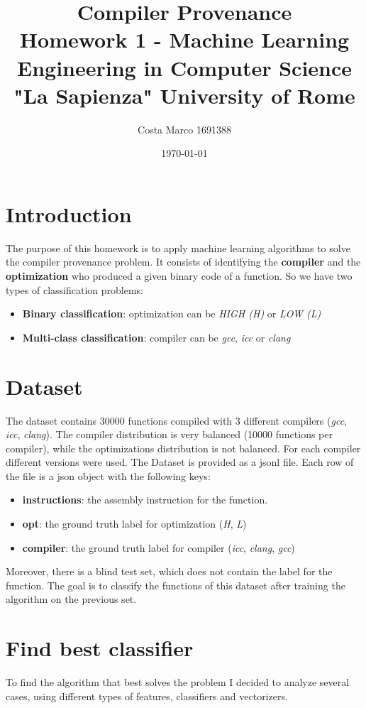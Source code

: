 \documentclass[11pt]{article}
\title{\textbf{Compiler Provenance} \\ \bigskip \large Homework 1 - Machine Learning \\ Engineering in Computer Science \\ "La Sapienza" University of Rome}
\author{Costa Marco 1691388}
\date{\today}
\begin{document}
\maketitle
\pagebreak
\tableofcontents
\pagebreak

\section{Introduction}
The purpose of this homework is to apply machine learning algorithms to solve the compiler provenance problem.
It consists of identifying the \textbf{compiler} and the \textbf{optimization} who produced a given binary code of a function.
So we have two types of classification problems:
\begin{itemize}
	\item \textbf{Binary classification}: optimization can be \textit{HIGH (H)} or \textit{LOW (L)}
	\item \textbf{Multi-class classification}: compiler can be \textit{gcc}, \textit{icc} or \textit{clang}
\end{itemize}

\section{Dataset}
The dataset contains 30000 functions
compiled with 3 different compilers (\textit{gcc}, \textit{icc}, \textit{clang}).
The compiler distribution is very balanced
(10000 functions per compiler), while the optimizations distribution is not balanced. For each compiler different versions were used.
The Dataset is provided as a jsonl file.
Each row of the file is a json object with the
following keys:
\begin{itemize}
\item \textbf{instructions}: the assembly instruction for the
function.
\item \textbf{opt}: the ground truth label for optimization (\textit{H}, \textit{L})
\item \textbf{compiler}: the ground truth label for compiler (\textit{icc},
\textit{clang}, \textit{gcc})
\end{itemize}
Moreover, there is a blind test set, which does not contain the label for the function. The goal is to classify the functions of this dataset after training the algorithm on the previous set.

\section{Find best classifier}
To find the algorithm that best solves the problem I decided to analyze several cases, using different types of features, classifiers and vectorizers.
\end{document}
